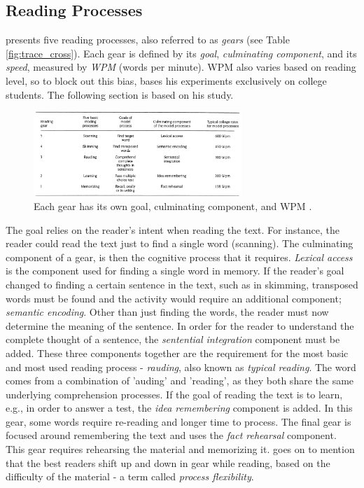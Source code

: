\subsection{Reading Processes}
 presents five reading processes, also referred to as \textit{gears} (see Table \ref{fig:trace_cross}). Each gear is defined by its \textit{goal}, \textit{culminating component}, and its \textit{speed}, measured by \textit{WPM} (words per minute). WPM also varies based on reading level, so to block out this bias, \citeauthor{carver_reading_1992} bases his experiments exclusively on college students. The following section is based on his study.

\begin{figure}[htbp]
\centering
\includegraphics[width=0.7\textwidth]{Pics/gears_list}
\caption{Each gear has its own goal, culminating component, and WPM \protect\cite{carver_reading_1992}.}
\label{fig:ucurve}
\end{figure}

The goal relies on the reader's intent when reading the text. For instance, the reader could read the text just to find a single word (scanning). The culminating component of a gear, is then the cognitive process that it requires. \textit{Lexical access} is the component used for finding a single word in memory. If the reader's goal changed to finding a certain sentence in the text, such as in skimming, transposed words must be found and the activity would require an additional component; \textit{semantic encoding}. Other than just finding the words, the reader must now determine the meaning of the sentence. In order for the reader to understand the complete thought of a sentence, the \textit{sentential integration} component must be added. These three components together are the requirement for the most basic and most used reading process - \textit{rauding}, also known as \textit{typical reading}. The word comes from a combination of 'auding' and 'reading', as they both share the same underlying comprehension processes. If the goal of reading the text is to learn, e.g., in order to answer a test, the \textit{idea remembering} component is added. In this gear, some words require re-reading and longer time to process. The final gear is focused around remembering the text and uses the \textit{fact rehearsal} component. This gear requires rehearsing the material and memorizing it. 
 goes on to mention that the best readers shift up and down in gear while reading, based on the difficulty of the material - a term called \textit{process flexibility}. 

